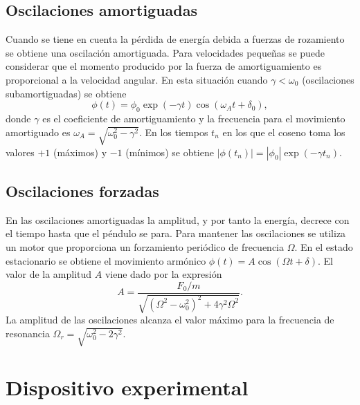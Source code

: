 \documentclass[11pt]{articulo}
\begin{document}
\subsection{Oscilaciones amortiguadas}

Cuando se tiene en cuenta la p\'erdida de energ\'ia debida a fuerzas de rozamiento se obtiene una oscilaci\'on amortiguada. Para velocidades peque\~nas se puede considerar que el momento producido por la fuerza de amortiguamiento es proporcional a la velocidad angular. En esta situaci\'on cuando $\gamma < \omega_0$ (oscilaciones subamortiguadas) se obtiene
%
\begin{equation*}
\phi (t) = \phi_0 \exp(-\gamma t) \cos(\omega_A t + \delta_0),
\end{equation*}
%
donde $\gamma$ es el coeficiente de amortiguamiento y la frecuencia para el movimiento amortiguado es $\omega_A = \sqrt{\omega_0^2 - \gamma^2}$. En los tiempos $t_n$ en los que el coseno toma los valores $+1$ (m\'aximos) y $-1$ (m\'inimos) se obtiene $\left|\phi\left(t_n\right)\right| = \left|\phi_0\right|\exp\left(-\gamma t_n\right)$.

\subsection{Oscilaciones forzadas}

En las oscilaciones amortiguadas la amplitud, y por tanto la energ\'ia, decrece con el tiempo hasta que el p\'endulo se para. Para mantener las oscilaciones se utiliza un motor que proporciona un forzamiento peri\'odico de frecuencia $\Omega$. En el estado estacionario se obtiene el movimiento arm\'onico $\phi(t) = A \cos ( \Omega t + \delta)$. El valor de la amplitud $A$ viene dado por la expresi\'on
%
\begin{equation*}
A = \frac{F_0/m}{\sqrt{\left(\Omega^2 - \omega_0^2\right)^2 + 4 \gamma^2\Omega^2}}.
\end{equation*}
%
La amplitud de las oscilaciones alcanza el valor m\'aximo para la frecuencia de resonancia $\Omega_r = \sqrt{\omega_0^2 - 2\gamma^2}$.


\section{Dispositivo experimental}
\end{document}
